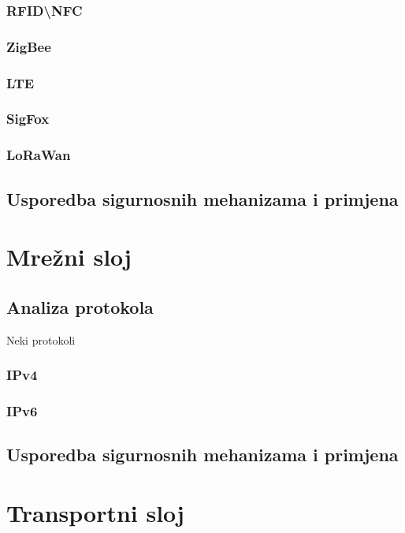 \documentclass[times, utf8, diplomski]{fer}
\begin{document}
\subsubsection{RFID\textbackslash NFC}

\subsubsection{ZigBee}

\subsubsection{LTE}

\subsubsection{SigFox}

\subsubsection{LoRaWan}

\subsection{Usporedba sigurnosnih mehanizama i primjena}

\section{Mrežni sloj}

\subsection{Analiza protokola}
Neki protokoli

\subsubsection{IPv4}

\subsubsection{IPv6}

\subsection{Usporedba sigurnosnih mehanizama i primjena}

\section{Transportni sloj}
\end{document}

